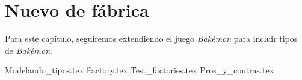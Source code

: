 \chapter{Nuevo de fábrica}
\label{chap:ambiguo}
  Para este capítulo, seguiremos extendiendo el juego \textit{Bakémon} para incluir tipos de 
  \textit{Bakémon}.

  {Modelando_tipos.tex}
  {Factory.tex}
  {Test_factories.tex}
  {Pros_y_contras.tex}

  \printbibliography[keyword=factory]